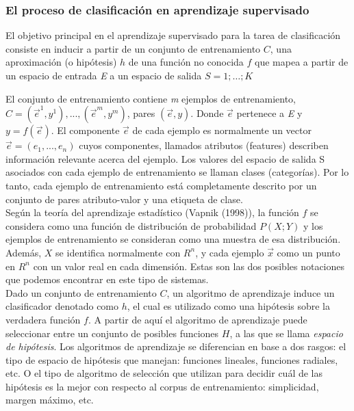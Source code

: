 \subsubsection*{El proceso de clasificación en aprendizaje supervisado}

El objetivo principal en el aprendizaje supervisado para la tarea de clasificación consiste en inducir a partir de un conjunto de entrenamiento $C$, una aproximación (o hipótesis) $h$ de una función no conocida $f$ que mapea a partir de un espacio de entrada \textit{E} a un espacio de salida $S = 1; …;K$

El conjunto de entrenamiento contiene \textit{m} ejemplos de entrenamiento, $C=(\vec{e}^1,y^1),...,(\vec{e}^m,y^m)$, pares $(\vec{e},y)$. Donde $\vec{e}$ pertenece a \textit{E} y $y=f(\vec{e})$. El componente $\vec{e}$ de cada ejemplo es normalmente un vector $\vec{e}=(e_1,...,e_n)$ cuyos componentes, llamados atributos (features) describen información relevante acerca del ejemplo. Los valores del espacio de salida S asociados con cada ejemplo de entrenamiento se llaman clases (categorías). Por lo tanto, cada ejemplo de entrenamiento está completamente descrito por un conjunto de pares atributo-valor y una etiqueta de clase.\\
Según la teoría del aprendizaje estadístico (Vapnik (1998)), la función $f$ se considera como una función de distribución de probabilidad $P(X;Y)$ y los ejemplos de entrenamiento se consideran como una muestra de esa distribución. Además, $X$ se identifica normalmente con $R^n$, y cada ejemplo $\vec{x}$ como un punto en $R^n$ con un valor real en cada dimensión. Estas son las dos posibles notaciones que podemos encontrar en este tipo de sistemas.\\
Dado un conjunto de entrenamiento $C$, un algoritmo de aprendizaje induce un clasificador denotado como $h$, el cual es utilizado como una hipótesis sobre la verdadera función $f$. A partir de aquí el algoritmo de aprendizaje puede seleccionar entre un conjunto de posibles funciones $H$, a las que se llama \textit{espacio de hipótesis}. Los algoritmos de aprendizaje se diferencian en base a dos rasgos: el tipo de espacio de hipótesis que manejan: funciones lineales, funciones radiales, etc. O el tipo de algoritmo de selección que utilizan para decidir cuál de las hipótesis es la mejor con respecto al corpus de entrenamiento: simplicidad, margen máximo, etc.\\
